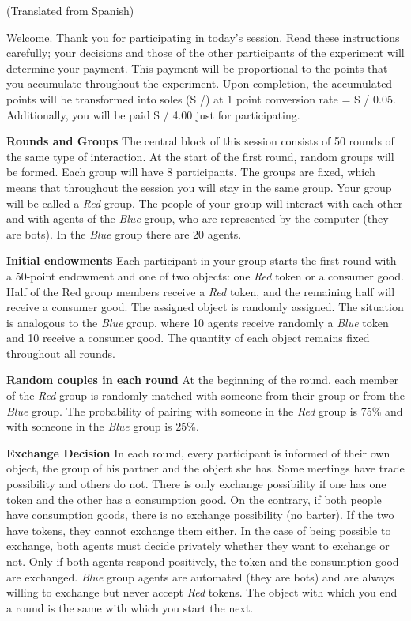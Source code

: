{{(Translated from Spanish)

Welcome. Thank you for participating in today's session. Read these instructions carefully; your decisions
and those of the other participants of the experiment will determine your payment. This payment will be proportional to the points that you accumulate throughout the experiment. Upon completion, the accumulated points will be transformed into soles (S /) at 1 point conversion rate = S / 0.05. Additionally, you will be paid S / 4.00 just for participating.

\textbf{ Rounds and Groups }
The central block of this session consists of 50 rounds of the same type of interaction. At the start of the first round, random groups will be formed. Each group will have 8 participants. The groups are fixed, which means that throughout the session you will stay in the same group. Your group will be called a \textit{Red} group. The people of your group
will interact with each other and with agents of the \textit{Blue} group, who are represented by the computer (they are bots). In the \textit{Blue} group there are 20 agents.
 
\textbf{ Initial endowments }
Each participant in your group starts the first round with a 50-point endowment and one of two objects: one \textit{Red} token or a consumer good. Half of the Red group members receive a \textit{Red} token, and the remaining half will receive a consumer good. The assigned object is randomly assigned. The situation is analogous to the \textit{Blue} group, where 10 agents receive randomly
a \textit{Blue} token and 10 receive a consumer good. The quantity of each object remains fixed throughout all rounds.
 
\textbf{ Random couples in each round }
At the beginning of the round, each member of the \textit{Red} group is randomly matched with someone from their group or from the \textit{Blue} group. The probability of pairing with someone in the \textit{Red} group is 75\% and with someone in the \textit{Blue} group is 25\%.
 
\textbf{ Exchange Decision }
In each round, every participant is informed of their own object, the group of his partner and the object she has.
Some meetings have trade possibility and others do not. There is only exchange possibility if one has one token and the other has a consumption good. On the contrary, if both people have consumption goods, there is no exchange possibility (no barter). If the two have tokens, they cannot exchange them either. In the case of being possible to exchange, both agents must decide privately whether they want to exchange or not. Only if both agents respond positively, the token and the consumption good are exchanged. \textit{Blue} group agents are automated (they are bots) and are always willing to exchange but never accept \textit{Red} tokens. The object with which you end a round is the same with which you start the next.
 


}}
